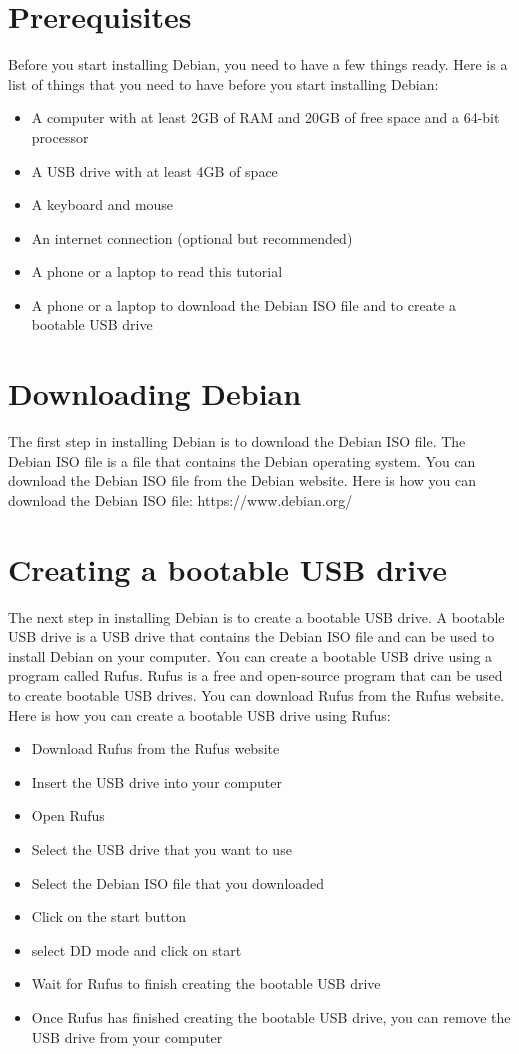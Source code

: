 \section{Prerequisites}
Before you start installing Debian, you need to have a few things ready. Here is a list of things that you need to have before you start installing Debian:
\begin{itemize}
    \item A computer with at least 2GB of RAM and 20GB of free space and a 64-bit processor
    \item A USB drive with at least 4GB of space
    \item A keyboard and mouse
    \item An internet connection (optional but recommended)
    \item A phone or a laptop to read this tutorial
    \item A phone or a laptop to download the Debian ISO file and to create a bootable USB drive
\end{itemize}

\section{Downloading Debian} 
The first step in installing Debian is to download the Debian ISO file. The Debian ISO file is a file that contains the Debian operating system. You can download the Debian ISO file from the Debian website. Here is how you can download the Debian ISO file: https://www.debian.org/

\section{Creating a bootable USB drive}

The next step in installing Debian is to create a bootable USB drive. A bootable USB drive is a USB drive that contains the Debian ISO file and can be used to install Debian on your computer. You can create a bootable USB drive using a program called Rufus. Rufus is a free and open-source program that can be used to create bootable USB drives. You can download Rufus from the Rufus website. Here is how you can create a bootable USB drive using Rufus:

\begin{itemize}
    \item Download Rufus from the Rufus website
    \item Insert the USB drive into your computer
    \item Open Rufus
    \item Select the USB drive that you want to use
    \item Select the Debian ISO file that you downloaded
    \item Click on the start button
    \item select DD mode and click on start
    \item Wait for Rufus to finish creating the bootable USB drive
    \item Once Rufus has finished creating the bootable USB drive, you can remove the USB drive from your computer
\end{itemize}

